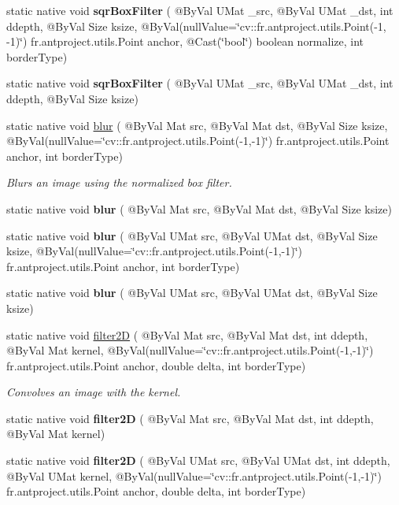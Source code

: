 \begin{DoxyCompactItemize}
\item 
static native void {\bfseries sqr\+Box\+Filter} ( @By\+Val U\+Mat \+\_\+src, @By\+Val U\+Mat \+\_\+dst, int ddepth, @By\+Val Size ksize, @By\+Val(null\+Value=\char`\"{}cv\+::\+fr.antproject.utils.Point(-\/1, -\/1)\char`\"{}) fr.antproject.utils.Point anchor, @Cast(\char`\"{}bool\char`\"{}) boolean normalize, int border\+Type)
\item 
static native void {\bfseries sqr\+Box\+Filter} ( @By\+Val U\+Mat \+\_\+src, @By\+Val U\+Mat \+\_\+dst, int ddepth, @By\+Val Size ksize)
\item 
static native void \hyperlink{group__imgproc__filter_ga2878e087c0294ad9e5f1996c07b303b4}{blur} ( @By\+Val Mat src, @By\+Val Mat dst, @By\+Val Size ksize, @By\+Val(null\+Value=\char`\"{}cv\+::\+fr.antproject.utils.Point(-\/1,-\/1)\char`\"{}) fr.antproject.utils.Point anchor, int border\+Type)
\begin{DoxyCompactList}\small\item\em Blurs an image using the normalized box filter. \end{DoxyCompactList}\item 
static native void {\bfseries blur} ( @By\+Val Mat src, @By\+Val Mat dst, @By\+Val Size ksize)
\item 
static native void {\bfseries blur} ( @By\+Val U\+Mat src, @By\+Val U\+Mat dst, @By\+Val Size ksize, @By\+Val(null\+Value=\char`\"{}cv\+::\+fr.antproject.utils.Point(-\/1,-\/1)\char`\"{}) fr.antproject.utils.Point anchor, int border\+Type)
\item 
static native void {\bfseries blur} ( @By\+Val U\+Mat src, @By\+Val U\+Mat dst, @By\+Val Size ksize)
\item 
static native void \hyperlink{group__imgproc__filter_gac272007b4c23c22cf0fd246522a2a34b}{filter2D} ( @By\+Val Mat src, @By\+Val Mat dst, int ddepth, @By\+Val Mat kernel, @By\+Val(null\+Value=\char`\"{}cv\+::\+fr.antproject.utils.Point(-\/1,-\/1)\char`\"{}) fr.antproject.utils.Point anchor, double delta, int border\+Type)
\begin{DoxyCompactList}\small\item\em Convolves an image with the kernel. \end{DoxyCompactList}\item 
static native void {\bfseries filter2D} ( @By\+Val Mat src, @By\+Val Mat dst, int ddepth, @By\+Val Mat kernel)
\item 
static native void {\bfseries filter2D} ( @By\+Val U\+Mat src, @By\+Val U\+Mat dst, int ddepth, @By\+Val U\+Mat kernel, @By\+Val(null\+Value=\char`\"{}cv\+::\+fr.antproject.utils.Point(-\/1,-\/1)\char`\"{}) fr.antproject.utils.Point anchor, double delta, int border\+Type)

\end{DoxyCompactItemize}
